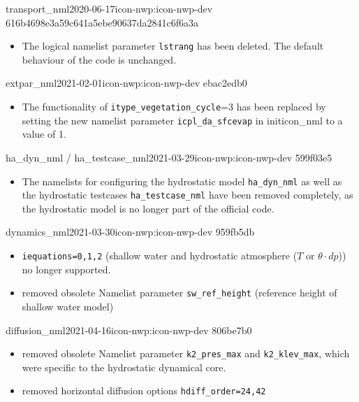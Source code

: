 \begin{changeitem}{transport\_nml}{2020-06-17}{icon-nwp:icon-nwp-dev 616b4698e3a59c641a5ebe90637da2841c6f6a3a}
  \begin{itemize}
   \item The logical namelist parameter \texttt{lstrang} has been deleted. The default behaviour of the code is unchanged.
  \end{itemize}
\end{changeitem}

\begin{changeitem}{extpar\_nml}{2021-02-01}{icon-nwp:icon-nwp-dev ebac2edb0}
  \begin{itemize}
   \item The functionality of \texttt{itype\_vegetation\_cycle}=3 has been replaced by setting the new namelist parameter \texttt{icpl\_da\_sfcevap} 
    in initicon\_nml to a value of 1.
  \end{itemize}
\end{changeitem}

\begin{changeitem}{ha\_dyn\_nml / ha\_testcase\_nml}{2021-03-29}{icon-nwp:icon-nwp-dev 599f03e5}
  \begin{itemize}
   \item The namelists for configuring the hydrostatic model \texttt{ha\_dyn\_nml} as well as the hydrostatic testcases 
   \texttt{ha\_testcase\_nml} have been removed completely, as the hydrostatic model is no longer part of the official code.
  \end{itemize}
\end{changeitem}

\begin{changeitem}{dynamics\_nml}{2021-03-30}{icon-nwp:icon-nwp-dev 959fb5db}
  \begin{itemize}
   \item \texttt{iequations=0,1,2} (shallow water and hydrostatic atmosphere ($T$ or $\theta\cdot dp$)) no longer supported.
   \item removed obsolete Namelist parameter \texttt{sw\_ref\_height} (reference height of shallow water model)
  \end{itemize}
\end{changeitem}

\begin{changeitem}{diffusion\_nml}{2021-04-16}{icon-nwp:icon-nwp-dev 806be7b0}
  \begin{itemize}
   \item removed obsolete Namelist parameter \texttt{k2\_pres\_max} and \texttt{k2\_klev\_max}, which were specific to the hydrostatic dynamical core.
   \item removed horizontal diffusion options \texttt{hdiff\_order=24,42}
  \end{itemize}
\end{changeitem}
